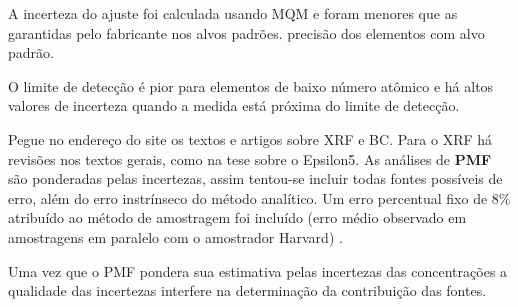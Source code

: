A incerteza do ajuste foi calculada usando MQM e foram menores que as garantidas
pelo fabricante nos alvos padrões.  precisão dos elementos com alvo padrão. 

O limite de detecção é pior para elementos de baixo número atômico e há
altos valores de incerteza quando a medida está próxima do limite de detecção.

Pegue no endereço do site os textos e artigos sobre XRF e BC.
Para o XRF há revisões nos textos gerais, como na tese sobre o Epsilon5.
As análises de \textbf{PMF} são ponderadas pelas incertezas, assim 
tentou-se incluir todas fontes possíveis de erro, além do erro instrínseco 
do método analítico. Um erro percentual fixo de 8\% atribuído ao método 
de amostragem foi incluído 
(erro médio observado em amostragens em paralelo com o amostrador Harvard)
\citep{santos2014}.



Uma vez que o PMF pondera sua estimativa pelas incertezas das concentrações a qualidade das incertezas interfere na determinação da contribuição das fontes.


